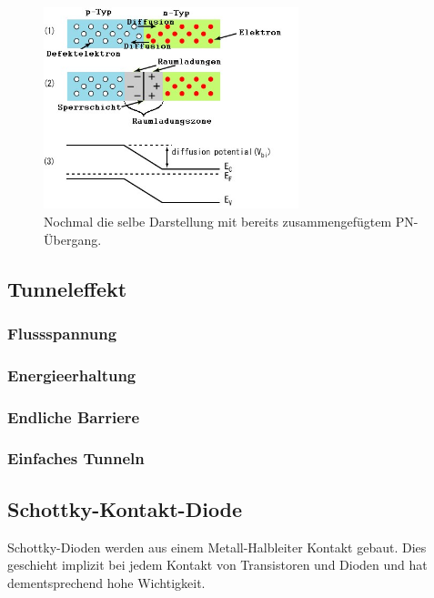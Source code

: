 \begin{figure}
    \centering
    \includegraphics[width=0.66\textwidth]{fig/pn-banddiagramm2}
    \caption{Nochmal die selbe Darstellung mit bereits zusammengefügtem PN-Übergang.}
    \label{fig:pn-banddiagramm}
\end{figure}



\subsection{Tunneleffekt }\label{k5:tunnelEffekt}
    \subsubsection{Flussspannung}
    \subsubsection{Energieerhaltung}
    \subsubsection{Endliche Barriere}
    \subsubsection{Einfaches Tunneln}

\subsection{Schottky-Kontakt-Diode }\label{k5:schottky}
Schottky-Dioden werden aus einem Metall-Halbleiter Kontakt gebaut. Dies geschieht implizit bei jedem Kontakt von Transistoren und Dioden und hat dementsprechend hohe Wichtigkeit.


